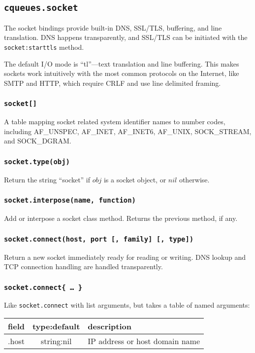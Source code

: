 \documentclass[11pt, oneside]{memoir}
\newcommand{\routine}[1]{\texttt{#1} }
\newcommand{\fn}[1]{\texttt{#1} }
\newcommand{\method}[1]{\texttt{#1} }
\newcounter{toccols}
\newenvironment{Module}[1]{
	\subsection{\texttt{#1}}
	\addtocontents{toc}{
		\protect\begin{multicols}{\value{toccols}}
	}
}{
	\addtocontents{toc}{\protect\end{multicols}}
}
\begin{document}
\begin{Module}{cqueues.socket}

The socket bindings provide built-in DNS, SSL/TLS, buffering, and line translation. DNS happens transparently, and SSL/TLS can be initiated with the \method{socket:starttls} method.

The default I/O mode is ``tl''---text translation and line buffering. This makes sockets work intuitively with the most common protocols on the Internet, like SMTP and HTTP, which require CRLF and use line delimited framing.

\subsubsection[\fn{socket[]}]{\fn{socket[]}}

A table mapping socket related system identifier names to number codes, including AF\_UNSPEC, AF\_INET, AF\_INET6, AF\_UNIX, SOCK\_STREAM, and SOCK\_DGRAM.

\subsubsection[\routine{socket.type}]{\routine{socket.type(obj)}}
Return the string ``socket'' if $obj$ is a socket object, or $nil$ otherwise.

\subsubsection[\fn{socket.interpose}]{\fn{socket.interpose(name, function)}}
Add or interpose a socket class method. Returns the previous method, if any.

\subsubsection[\fn{socket.connect}]{\fn{socket.connect(host, port [, family] [, type])}}
Return a new socket immediately ready for reading or writing. DNS lookup and TCP connection handling are handled transparently.

\subsubsection[\fn{socket.connect}]{\fn{socket.connect\{ … \}}}
Like \fn{socket.connect} with list arguments, but takes a table of named arguments:

\begin{tabular}{r | c | p{4.5in}}
field & type:default & description\\\hline
.host & string:nil & IP address or host domain name \\


\end{tabular}
\end{Module}
\end{document}

